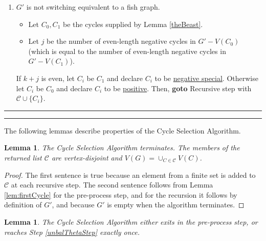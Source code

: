 \documentclass[12pt]{article}
\newtheorem{lemma}[theorem]{Lemma}
\begin{document}
\begin{enumerate}
\begin{enumerate}
                \item \label{endStep}$G'$ is not switching equivalent to a fish graph.
                \begin{itemize}
                    \item Let $C_0, C_1$ be the cycles supplied by Lemma \ref{theBeast}.
                    \item Let $j$ be the number of even-length negative cycles in $G' - V(C_0)$ (which is equal to the number of even-length negative cycles in $G' - V(C_1)$).
                \end{itemize}

                If $k + j$ is even, let $C_i$ be $C_1$ and declare $C_i$ to be \underline{negative special}. Otherwise let $C_i$ be $C_0$ and declare $C_i$ to be \underline{positive}. Then, \textbf{goto} Recursive step with $\mathcal{C} \cup \{C_i\}$.
            \end{enumerate}

        \end{enumerate} 

\hrule

\smallskip

\hrule

\vspace{1cm}

The following lemmas describe properties of the Cycle Selection Algorithm.

\begin{lemma}\label{lem:cycSelAlg}
    The Cycle Selection Algorithm terminates. The members of the returned list $\mathcal{C}$ are vertex-disjoint and $V(G) = \cup_{C \in \mathcal{C}}V(C)$.
\end{lemma}
\begin{proof}
The first sentence is true because an element from a finite set is added to $\mathcal{C}$ at each recursive step. The second sentence follows from Lemma \ref{lem:firstCycle} for the pre-process step, and for the recursion it follows by definition of $G'$, and because $G'$ is empty when the algorithm terminates.    
\end{proof}

\begin{lemma}\label{lem:step8}
    The Cycle Selection Algorithm either exits in the pre-process step, or reaches Step \ref{unbalThetaStep} exactly once.
\end{lemma}
\end{document}
